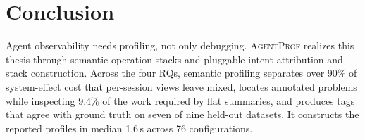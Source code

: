 \documentclass[letterpaper]{article}
\newcommand{\sys}{\textsc{AgentProf}\xspace}
\begin{document}
\section{Conclusion}

Agent observability needs profiling, not only debugging.
\sys realizes this thesis through semantic operation stacks and pluggable
intent attribution and stack construction.
Across the four RQs, semantic profiling separates over 90\% of system-effect
cost that per-session views leave mixed, locates annotated problems while
inspecting 9.4\% of the work required by flat summaries, and produces tags that
agree with ground truth on seven of nine held-out datasets. It constructs the
reported profiles in median 1.6\,s across 76 configurations.


\end{document}
